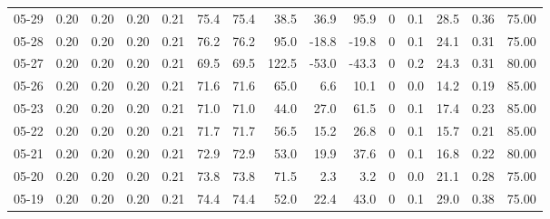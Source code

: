 \begin{threeparttable}
{\begin{tabular}{lrrrrrrrrrrrrrr}
  05-29 &          0.20 &          0.20 &          0.20 &        0.21 &                75.4 &               75.4 &                38.5 &       36.9 &         95.9 &              0 &                 0.1 &             28.5 &            0.36 &                  75.00 \\
  05-28 &          0.20 &          0.20 &          0.20 &        0.21 &                76.2 &               76.2 &                95.0 &      -18.8 &        -19.8 &              0 &                 0.1 &             24.1 &            0.31 &                  75.00 \\
  05-27 &          0.20 &          0.20 &          0.20 &        0.21 &                69.5 &               69.5 &               122.5 &      -53.0 &        -43.3 &              0 &                 0.2 &             24.3 &            0.31 &                  80.00 \\
  05-26 &          0.20 &          0.20 &          0.20 &        0.21 &                71.6 &               71.6 &                65.0 &        6.6 &         10.1 &              0 &                 0.0 &             14.2 &            0.19 &                  85.00 \\
  05-23 &          0.20 &          0.20 &          0.20 &        0.21 &                71.0 &               71.0 &                44.0 &       27.0 &         61.5 &              0 &                 0.1 &             17.4 &            0.23 &                  85.00 \\
  05-22 &          0.20 &          0.20 &          0.20 &        0.21 &                71.7 &               71.7 &                56.5 &       15.2 &         26.8 &              0 &                 0.1 &             15.7 &            0.21 &                  85.00 \\
  05-21 &          0.20 &          0.20 &          0.20 &        0.21 &                72.9 &               72.9 &                53.0 &       19.9 &         37.6 &              0 &                 0.1 &             16.8 &            0.22 &                  80.00 \\
  05-20 &          0.20 &          0.20 &          0.20 &        0.21 &                73.8 &               73.8 &                71.5 &        2.3 &          3.2 &              0 &                 0.0 &             21.1 &            0.28 &                  75.00 \\
  05-19 &          0.20 &          0.20 &          0.20 &        0.21 &                74.4 &               74.4 &                52.0 &       22.4 &         43.0 &              0 &                 0.1 &             29.0 &            0.38 &                  75.00 \\

\end{tabular}}
\end{threeparttable}
